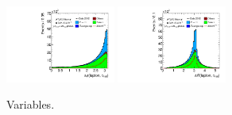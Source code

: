 \begin{figure}[tp]
  \includegraphics[width=0.32\textwidth]{figures/presel/taulep-dphi}
  \includegraphics[width=0.32\textwidth]{figures/presel/taulep-dR}
  \caption{Variables.}
  \label{fig:stategy-presel-1}
\end{figure}

